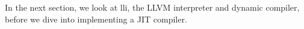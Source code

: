 In the next section, we look at lli, the LLVM interpreter and dynamic compiler, before we dive into implementing a JIT compiler.\par






























































